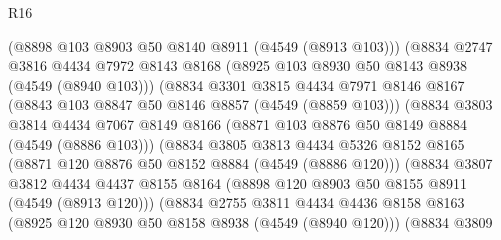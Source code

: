 \begin{lexlean}{R16}
\begin{coremodule}
                                (@8898 @103 @8903 @50 @8140 @8911 (@4549 (@8913 @103)))
                                (@8834
                                  @2747
                                  @3816
                                  @4434
                                  @7972
                                  @8143
                                  @8168
                                  (@8925 @103 @8930 @50 @8143 @8938 (@4549 (@8940 @103)))
                                  (@8834
                                    @3301
                                    @3815
                                    @4434
                                    @7971
                                    @8146
                                    @8167
                                    (@8843 @103 @8847 @50 @8146 @8857 (@4549 (@8859 @103)))
                                    (@8834
                                      @3803
                                      @3814
                                      @4434
                                      @7067
                                      @8149
                                      @8166
                                      (@8871 @103 @8876 @50 @8149 @8884 (@4549 (@8886 @103)))
                                      (@8834
                                        @3805
                                        @3813
                                        @4434
                                        @5326
                                        @8152
                                        @8165
                                        (@8871 @120 @8876 @50 @8152 @8884 (@4549 (@8886 @120)))
                                        (@8834
                                          @3807
                                          @3812
                                          @4434
                                          @4437
                                          @8155
                                          @8164
                                          (@8898 @120 @8903 @50 @8155 @8911 (@4549 (@8913 @120)))
                                          (@8834
                                            @2755
                                            @3811
                                            @4434
                                            @4436
                                            @8158
                                            @8163
                                            (@8925 @120 @8930 @50 @8158 @8938 (@4549 (@8940 @120)))
                                            (@8834
                                              @3809

\end{coremodule}
\end{lexlean}
